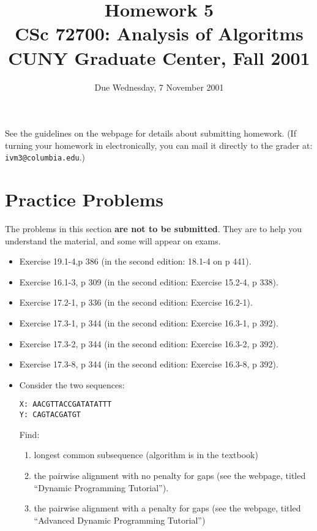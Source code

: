\documentclass[11pt]{article}
\begin{document}
\title{Homework 5\\
       CSc 72700: Analysis of Algoritms\\
       CUNY Graduate Center, Fall 2001 }
\date{Due Wednesday, 7 November 2001}
\author{}
\maketitle

See the guidelines on the webpage for details about submitting homework.
(If turning your homework in electronically, you can mail it directly
to the grader at: {\tt ivm3@columbia.edu}.)

\section*{Practice Problems}

The problems in this section {\bf are not to be submitted}.  They are to
help you understand the material, and some will appear on exams.

\begin{itemize}
    \item Exercise 19.1-4,p 386 (in the second edition: 18.1-4 on p 441).
    \item Exercise 16.1-3, p 309 
	(in the second edition: Exercise 15.2-4, p 338).
    \item Exercise 17.2-1, p 336 (in the second edition: Exercise 16.2-1).
    \item Exercise 17.3-1, p 344 
	(in the second edition: Exercise 16.3-1, p 392).
    \item Exercise 17.3-2, p 344 
	(in the second edition: Exercise 16.3-2, p 392).
    \item Exercise 17.3-8, p 344 
	(in the second edition: Exercise 16.3-8, p 392).
    \item Consider the two sequences:
\begin{verbatim}
X: AACGTTACCGATATATTT
Y: CAGTACGATGT
\end{verbatim}
	Find:
	\begin{enumerate}
	    \item longest common subsequence (algorithm is in the textbook)
	    \item the pairwise alignment with no penalty for gaps (see 
		the webpage, titled ``Dynamic Programming 
		Tutorial'').
	    \item the pairwise alignment with a penalty for gaps (see 
		the webpage, titled ``Advanced Dynamic 
		Programming Tutorial'')
	\end{enumerate}
\end{itemize}
\end{document}
